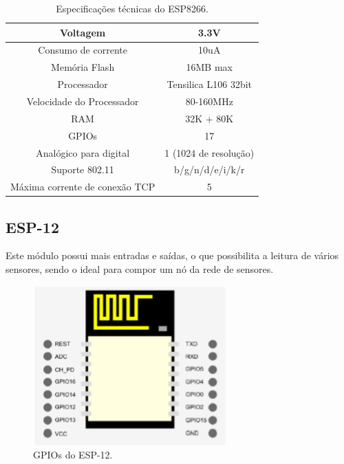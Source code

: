 \begin{table}[H]
\centering
\caption{Especificações técnicas do ESP8266.}
\begin{tabular}{c|c}
\hline
Voltagem 						& 3.3V 					\\\hline
Consumo de corrente 			& 10uA 					\\\hline
Memória Flash 					& 16MB max				\\\hline
Processador 					& Tensilica L106 32bit	\\\hline
Velocidade do Processador 		& 80-160MHz				\\\hline
RAM 							& 32K + 80K 			\\\hline
GPIOs 							& 17		 			\\\hline
Analógico para digital 			& 1 (1024 de resolução)	\\\hline
Suporte 802.11 					& b/g/n/d/e/i/k/r		\\\hline
Máxima corrente de conexão TCP	& 5						\\\hline
\end{tabular}
\label{tab:esp8266}
\end{table}


\subsection{ESP-12}

Este módulo possui mais entradas e saídas, o que possibilita a leitura de vários sensores, sendo o ideal para compor um nó da rede de sensores.

\begin{figure}[H]
\centering
\includegraphics[scale=1]{./04-figuras/esp-12.png}
\begingroup
\caption{GPIOs do ESP-12.}
\vspace{-\baselineskip}
\label{fig:esp12-gpios}
\endgroup
\end{figure}

